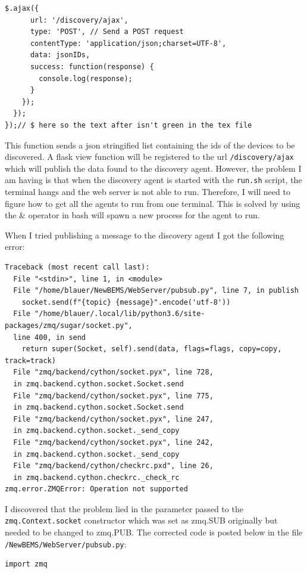 \documentclass[fontsize=11pt, %
                             paper=letter, %
                             twoside, %
                             captions=tableheading,
                             index=totoc,
                             hyperref]{labbook}
\begin{document}
\begin{addmargin}[0cm]{0cm}
\begin{Verbatim}[tabsize=4]
    $.ajax({
      url: '/discovery/ajax',
      type: 'POST', // Send a POST request
      contentType: 'application/json;charset=UTF-8',
      data: jsonIDs,
      success: function(response) {
        console.log(response);
      }
    });
  });
});// $ here so the text after isn't green in the tex file
\end{Verbatim}
This function sends a json stringified list containing the ids of the devices to be discovered. A flask view function will be registered to the url \texttt{/discovery/ajax} which will publish the data found to the discovery agent. However, the problem I am having is that when the discovery agent is started with the \texttt{run.sh} script, the terminal hangs and the web server is not able to run. Therefore, I will need to figure how to get all the agents to run from one terminal. This is solved by using the \& operator in bash will spawn a new process for the agent to run.

When I tried publishing a message to the discovery agent I got the following error:
\begin{Verbatim}
Traceback (most recent call last):
  File "<stdin>", line 1, in <module>
  File "/home/blauer/NewBEMS/WebServer/pubsub.py", line 7, in publish
    socket.send(f"{topic} {message}".encode('utf-8'))
  File "/home/blauer/.local/lib/python3.6/site-packages/zmq/sugar/socket.py", 
  line 400, in send
    return super(Socket, self).send(data, flags=flags, copy=copy, track=track)
  File "zmq/backend/cython/socket.pyx", line 728, 
  in zmq.backend.cython.socket.Socket.send
  File "zmq/backend/cython/socket.pyx", line 775, 
  in zmq.backend.cython.socket.Socket.send
  File "zmq/backend/cython/socket.pyx", line 247, 
  in zmq.backend.cython.socket._send_copy
  File "zmq/backend/cython/socket.pyx", line 242, 
  in zmq.backend.cython.socket._send_copy
  File "zmq/backend/cython/checkrc.pxd", line 26, 
  in zmq.backend.cython.checkrc._check_rc
zmq.error.ZMQError: Operation not supported
\end{Verbatim}
I discovered that the problem lied in the parameter passed to the \texttt{zmq.Context.socket} constructor which was set as zmq.SUB originally but needed to be changed to zmq.PUB. The corrected code is posted below in the file \texttt{/NewBEMS/WebServer/pubsub.py}:
\begin{Verbatim}
import zmq


\end{Verbatim}
\end{addmargin}
\end{document}

